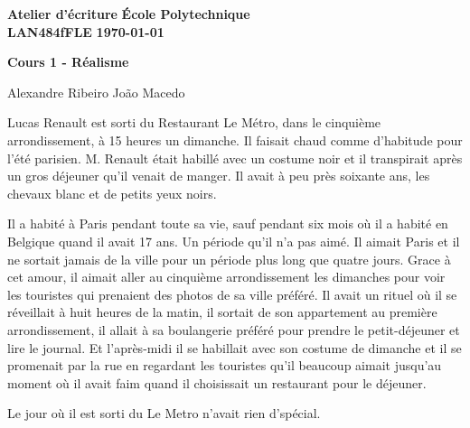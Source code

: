 \documentclass[10pt]{article} %
\newcommand{\createHeader}[5]{
	\noindent
	\normalsize\textbf{#2} \hfill \textbf{#1}\\
	\normalsize\textbf{#3} \hfill \textbf{\today}\vspace{20pt}
	\centerline{\Large \textbf{#5}}\vspace{3pt}
	\centerline{\normalsize #4}\vspace{20pt}}
\begin{document}
\createHeader{École Polytechnique}{Atelier d'écriture}{LAN484fFLE}{Alexandre Ribeiro João Macedo}{Cours 1 - Réalisme}

Lucas Renault est sorti du Restaurant Le Métro, dans le cinquième arrondissement, à 15 heures un dimanche. Il faisait chaud comme d'habitude pour l'été parisien. M. Renault était habillé avec un costume noir et il transpirait après un gros déjeuner qu'il venait de manger. Il avait à peu près soixante ans, les chevaux blanc et de petits yeux noirs. 

Il a habité à Paris pendant toute sa vie, sauf pendant six mois où il a habité en Belgique quand il avait 17 ans. Un période qu'il n'a pas aimé. Il aimait Paris et il ne sortait jamais de la ville pour un période plus long que quatre jours. Grace à cet amour, il aimait aller au cinquième arrondissement les dimanches pour voir les touristes qui prenaient des photos de sa ville préféré. Il avait un rituel où il se réveillait à huit heures de la matin, il sortait de son appartement au première arrondissement, il allait à sa boulangerie préféré pour prendre le petit-déjeuner et lire le journal. Et l'après-midi il se habillait avec son costume de dimanche et il se promenait par la rue en regardant les touristes qu'il beaucoup aimait jusqu'au moment où il avait faim quand il choisissait un restaurant pour le déjeuner.

Le jour où il est sorti du Le Metro n'avait rien d'spécial.
\end{document}
